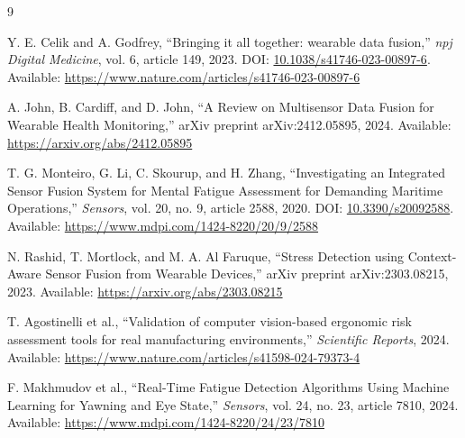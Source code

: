 \documentclass[11pt,a4paper]{article}
\begin{document}
\begin{thebibliography}{9}

Y. E. Celik and A. Godfrey, ``Bringing it all together: wearable data fusion,'' \textit{npj Digital Medicine}, vol. 6, article 149, 2023. DOI: \href{https://doi.org/10.1038/s41746-023-00897-6}{10.1038/s41746-023-00897-6}. Available: \url{https://www.nature.com/articles/s41746-023-00897-6}

A. John, B. Cardiff, and D. John, ``A Review on Multisensor Data Fusion for Wearable Health Monitoring,'' arXiv preprint arXiv:2412.05895, 2024. Available: \url{https://arxiv.org/abs/2412.05895}

T. G. Monteiro, G. Li, C. Skourup, and H. Zhang, ``Investigating an Integrated Sensor Fusion System for Mental Fatigue Assessment for Demanding Maritime Operations,'' \textit{Sensors}, vol. 20, no. 9, article 2588, 2020. DOI: \href{https://doi.org/10.3390/s20092588}{10.3390/s20092588}. Available: \url{https://www.mdpi.com/1424-8220/20/9/2588}

N. Rashid, T. Mortlock, and M. A. Al Faruque, ``Stress Detection using Context-Aware Sensor Fusion from Wearable Devices,'' arXiv preprint arXiv:2303.08215, 2023. Available: \url{https://arxiv.org/abs/2303.08215}

T. Agostinelli et al., ``Validation of computer vision-based ergonomic risk assessment tools for real manufacturing environments,'' \textit{Scientific Reports}, 2024. Available: \url{https://www.nature.com/articles/s41598-024-79373-4}

F. Makhmudov et al., ``Real-Time Fatigue Detection Algorithms Using Machine Learning for Yawning and Eye State,'' \textit{Sensors}, vol. 24, no. 23, article 7810, 2024. Available: \url{https://www.mdpi.com/1424-8220/24/23/7810}

\end{thebibliography}
\end{document}
